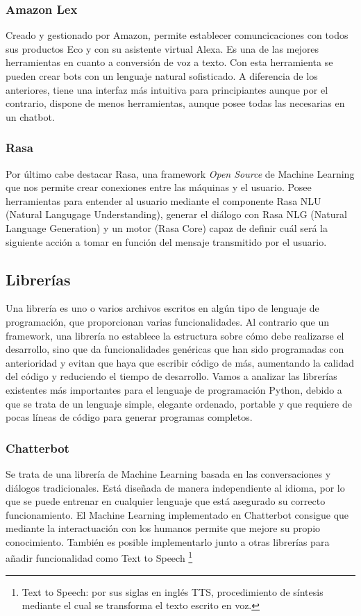 \subsubsection{Amazon Lex}
Creado y gestionado por Amazon, permite establecer comuncicaciones con todos sus productos Eco y con su asistente virtual Alexa. Es una de las mejores herramientas en cuanto a conversión de voz a texto. Con esta herramienta se pueden crear bots con un lenguaje natural sofisticado. A diferencia de los anteriores, tiene una interfaz más intuitiva para principiantes aunque por el contrario, dispone de menos herramientas, aunque posee todas las necesarias en un chatbot.

\subsubsection{Rasa}
Por último cabe destacar Rasa, una framework \textit{Open Source} de Machine Learning que nos permite crear conexiones entre las máquinas y el usuario. Posee herramientas para entender al usuario mediante el componente Rasa NLU (Natural Langugage Understanding), generar el diálogo con Rasa NLG (Natural Language Generation) y un motor (Rasa Core) capaz de definir cuál será la siguiente acción a tomar en función del mensaje transmitido por el usuario.   


\subsection{Librerías}

Una librería es uno o varios archivos escritos en algún tipo de lenguaje de programación, que proporcionan varias funcionalidades. Al contrario que un framework, una librería no establece la estructura sobre cómo debe realizarse el desarrollo, sino que da funcionalidades genéricas que han sido programadas con anterioridad y evitan que haya que escribir código de más, aumentando la calidad del código y reduciendo el tiempo de desarrollo.
Vamos a analizar las librerías existentes más importantes para el lenguaje de programación Python, debido a que se trata de un lenguaje simple, elegante ordenado, portable y que requiere de pocas líneas de código para generar programas completos.

\subsubsection{Chatterbot}
Se trata de una librería de Machine Learning basada en las conversaciones y diálogos tradicionales. Está diseñada de manera independiente al idioma, por lo que se puede entrenar en cualquier lenguaje que está asegurado su correcto funcionamiento. 
El Machine Learning implementado en Chatterbot consigue que mediante la interactuación con los humanos permite que mejore su propio conocimiento. También es posible implementarlo junto a otras librerías para añadir funcionalidad como Text to Speech \footnote{Text to Speech: por sus siglas en inglés TTS, procedimiento de síntesis mediante el cual se transforma el texto escrito en voz.}

